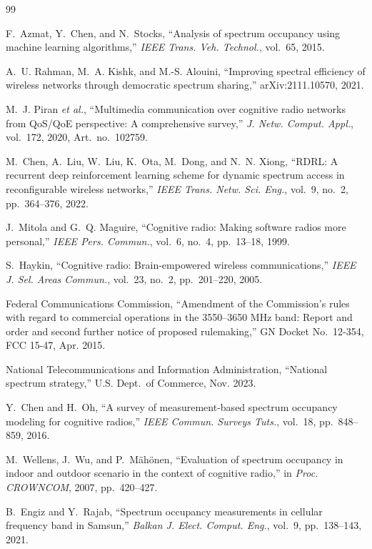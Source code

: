 \documentclass[lettersize,journal]{IEEEtran}
\begin{document}
\begin{thebibliography}{99}
\footnotesize

 F.~Azmat, Y.~Chen, and N.~Stocks, ``Analysis of spectrum occupancy using machine learning algorithms,'' \emph{IEEE Trans. Veh. Technol.}, vol.~65, 2015.

 A.~U. Rahman, M.~A. Kishk, and M.-S. Alouini, ``Improving spectral efficiency of wireless networks through democratic spectrum sharing,'' arXiv:2111.10570, 2021.

 M.~J. Piran \emph{et al.}, ``Multimedia communication over cognitive radio networks from QoS/QoE perspective: A comprehensive survey,'' \emph{J. Netw. Comput. Appl.}, vol.~172, 2020, Art.\ no.\ 102759.

 M.~Chen, A.~Liu, W.~Liu, K.~Ota, M.~Dong, and N.~N. Xiong, ``RDRL: A recurrent deep reinforcement learning scheme for dynamic spectrum access in reconfigurable wireless networks,'' \emph{IEEE Trans. Netw. Sci. Eng.}, vol.~9, no.~2, pp.~364--376, 2022.

 J.~Mitola and G.~Q. Maguire, ``Cognitive radio: Making software radios more personal,'' \emph{IEEE Pers. Commun.}, vol.~6, no.~4, pp.~13--18, 1999.

 S.~Haykin, ``Cognitive radio: Brain-empowered wireless communications,'' \emph{IEEE J. Sel. Areas Commun.}, vol.~23, no.~2, pp.~201--220, 2005.

 Federal Communications Commission, ``Amendment of the Commission's rules with regard to commercial operations in the 3550--3650 MHz band: Report and order and second further notice of proposed rulemaking,'' GN Docket No.~12-354, FCC 15-47, Apr. 2015.

 National Telecommunications and Information Administration, ``National spectrum strategy,'' U.S. Dept.\ of Commerce, Nov. 2023.

 Y.~Chen and H.~Oh, ``A survey of measurement-based spectrum occupancy modeling for cognitive radios,'' \emph{IEEE Commun. Surveys Tuts.}, vol.~18, pp.~848--859, 2016.

 M.~Wellens, J.~Wu, and P.~M\"ah\"onen, ``Evaluation of spectrum occupancy in indoor and outdoor scenario in the context of cognitive radio,'' in \emph{Proc. CROWNCOM}, 2007, pp.~420--427.

 B.~Engiz and Y.~Rajab, ``Spectrum occupancy measurements in cellular frequency band in Samsun,'' \emph{Balkan J. Elect. Comput. Eng.}, vol.~9, pp.~138--143, 2021.


\end{thebibliography}
\end{document}
